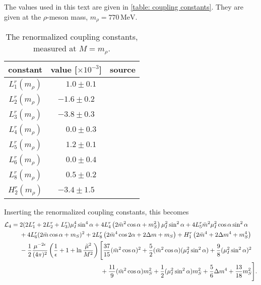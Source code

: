 The values used in this text are given in \autoref{table: coupling constants}.
They are given at the $\rho$-meson mass, $m_\rho = 770\, \text{MeV}$.
%
\begin{table}
    \centering
    \def\arraystretch{1.2}
    \caption{The renormalized coupling constants, measured at $M = m_\rho$.}
    \label{table: coupling constants}
    \begin{tabular}{c c c}
        \hline \hline
        constant & value [$\times 10^{-3}$] & source \\
        \hline
        $L_1^r(m_\rho)$ & $\phantom{-}1.0 \pm 0.1 $ & \autocite{bijnensMesonicLowEnergyConstants2014} \\
        $L_2^r(m_\rho)$ & $-1.6 \pm 0.2 $ & \autocite{bijnensMesonicLowEnergyConstants2014} \\
        $L_3^r(m_\rho)$ & $-3.8 \pm 0.3 $ & \autocite{bijnensMesonicLowEnergyConstants2014} \\
        $L_4^r(m_\rho)$ & $\phantom{-}0.0 \pm 0.3 $ & \autocite{bijnensMesonicLowEnergyConstants2014} \\
        $L_5^r(m_\rho)$ & $\phantom{-}1.2 \pm 0.1 $ & \autocite{bijnensMesonicLowEnergyConstants2014} \\
        $L_6^r(m_\rho)$ & $\phantom{-}0.0 \pm 0.4 $ & \autocite{bijnensMesonicLowEnergyConstants2014} \\
        $L_8^r(m_\rho)$ & $\phantom{-}0.5 \pm 0.2 $ & \autocite{bijnensMesonicLowEnergyConstants2014} \\
        $H_2^r(m_\rho)$ & $-3.4 \pm 1.5 $ & \autocite{jaminFlavoursymmetryBreakingQuark2002} 
    \end{tabular}
\end{table}
%
Inserting the renormalized coupling constants, this becomes
%
\begin{align}
    \label{nlo static lagrangian}
    \nonumber
    \mathcal{L}_4
    = {}&
    2(2L_1^r + 2L_2^r + L_3^r) \mu_I^4 \sin^4\alpha
    + 4  L_4^r \left( 2 \bar m^2 \cos\alpha + m_S^2 \right) \mu_I^2\sin^2\alpha
    + 4 L_5^r \bar m^2 \mu_I^2 \cos\alpha \sin^2 \alpha 
    \\ \nonumber
    & 
    + 4 L_6^r (2\bar m\cos\alpha + m_S)^2
    + 2 L_8^r \left(2 \bar m^4 \cos2\alpha + 2 \Delta m + m_S\right)
    + H_1^r \left(2\bar m^4 + 2\Delta m^4 + m_S^4 \right)
    \\ \nonumber
    &
    - \frac{1}{2}\frac{\mu^{-2\epsilon}}{(4\pi)^2}
    \left( \frac{1}{\epsilon} + 1 + \ln\frac{\tilde \mu^2}{M^2} \right)
    \Bigg[
        \frac{37}{15} (\bar m^2 \cos\alpha)^2
        +\frac{5}{2} (\bar m^2 \cos\alpha)(\mu_I^2\sin^2\alpha)
        +\frac{9}{8} (\mu_I^2\sin^2\alpha)^2 \\
        &
        \quad\quad\quad\quad\quad\quad\quad\quad\quad\quad\quad\quad\quad
        +\frac{11}{9} (\bar m^2 \cos\alpha)m_S^2
        +\frac{1}{2} (\mu_I^2\sin^2\alpha)m_S^2
        +\frac{5}{6} \Delta m^4
        +\frac{13}{18} m_S^2
    \Bigg].
\end{align}



